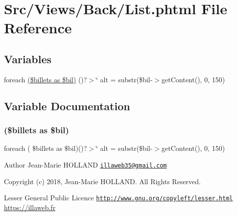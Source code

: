 \hypertarget{_back_2_list_8phtml}{}\section{Src/\+Views/\+Back/\+List.phtml File Reference}
\label{_back_2_list_8phtml}
\subsection*{Variables}
\begin{DoxyCompactItemize}
\item 
foreach \hyperlink{_back_2_list_8phtml_a1f60df41da29a5ab6912652ef3c1cea5}{(\$billets as \$bil)} ()?$>$\char`\"{} alt = substr(\$bil-\/$>$get\+Content(), 0, 150)
\end{DoxyCompactItemize}


\subsection{Variable Documentation}
\mbox{\label{_back_2_list_8phtml_a1f60df41da29a5ab6912652ef3c1cea5}} 
\subsubsection{\texorpdfstring{(\$billets as \$bil)}{($billets as $bil)}}
{\footnotesize\ttfamily foreach ( \$billets as \$bil)()?$>$\char`\"{} alt = substr(\$bil-\/$>$get\+Content(), 0, 150)}

\begin{DoxyAuthor}{Author}
Jean-\/\+Marie H\+O\+L\+L\+A\+ND \href{mailto:illaweb35@gmail.com}{\tt illaweb35@gmail.\+com} 
\end{DoxyAuthor}
\begin{DoxyCopyright}{Copyright}
(c) 2018, Jean-\/\+Marie H\+O\+L\+L\+A\+ND. All Rights Reserved.
\end{DoxyCopyright}
Lesser General Public Licence \href{http://www.gnu.org/copyleft/lesser.html}{\tt http\+://www.\+gnu.\+org/copyleft/lesser.\+html} \hyperlink{}{https\+://illaweb.\+fr}